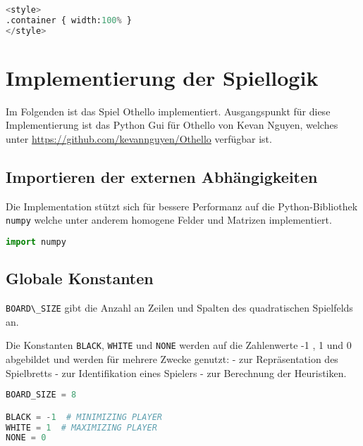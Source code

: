 \begin{lstlisting}[language=Python]
%%HTML
<style>
.container { width:100% }
</style>
\end{lstlisting}

\hypertarget{implementierung-der-spiellogik}{%
\section{Implementierung der
Spiellogik}\label{implementierung-der-spiellogik}}

Im Folgenden ist das Spiel Othello implementiert. Ausgangspunkt für
diese Implementierung ist das Python Gui für Othello von Kevan Nguyen,
welches unter \url{https://github.com/kevannguyen/Othello} verfügbar
ist.

\hypertarget{importieren-der-externen-abhuxe4ngigkeiten}{%
\subsection{Importieren der externen
Abhängigkeiten}\label{importieren-der-externen-abhuxe4ngigkeiten}}

Die Implementation stützt sich für bessere Performanz auf die
Python-Bibliothek \passthrough{\lstinline!numpy!} welche unter anderem
homogene Felder und Matrizen implementiert.

\begin{lstlisting}[language=Python]
import numpy
\end{lstlisting}

\hypertarget{globale-konstanten}{%
\subsection{Globale Konstanten}\label{globale-konstanten}}

\passthrough{\lstinline!BOARD\_SIZE!} gibt die Anzahl an Zeilen und
Spalten des quadratischen Spielfelds an.

Die Konstanten \passthrough{\lstinline!BLACK!},
\passthrough{\lstinline!WHITE!} und \passthrough{\lstinline!NONE!}
werden auf die Zahlenwerte -1 , 1 und 0 abgebildet und werden für
mehrere Zwecke genutzt: - zur Repräsentation des Spielbretts - zur
Identifikation eines Spielers - zur Berechnung der Heuristiken.

\begin{lstlisting}[language=Python]
BOARD_SIZE = 8

BLACK = -1  # MINIMIZING PLAYER
WHITE = 1  # MAXIMIZING PLAYER
NONE = 0
\end{lstlisting}

